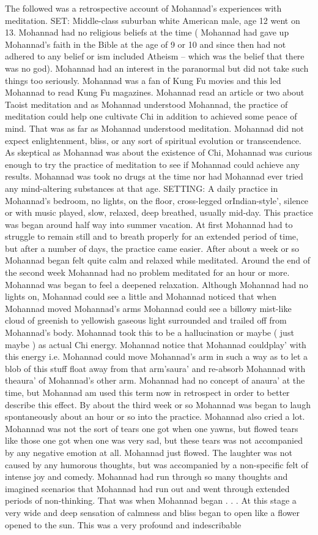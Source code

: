 \documentclass[12pt]{book}
\begin{document}
The followed was a retrospective account of Mohannad's experiences with meditation. SET: Middle-class suburban white American male, age 12 went on 13. Mohannad had no religious beliefs at the time ( Mohannad had gave up Mohannad's faith in the Bible at the age of 9 or 10 and since then had not adhered to any belief or ism included Atheism -- which was the belief that there was no god). Mohannad had an interest in the paranormal but did not take such things too seriously. Mohannad was a fan of Kung Fu movies and this led Mohannad to read Kung Fu magazines. Mohannad read an article or two about Taoist meditation and as Mohannad understood Mohannad, the practice of meditation could help one cultivate Chi in addition to achieved some peace of mind. That was as far as Mohannad understood meditation. Mohannad did not expect enlightenment, bliss, or any sort of spiritual evolution or transcendence. As skeptical as Mohannad was about the existence of Chi, Mohannad was curious enough to try the practice of meditation to see if Mohannad could achieve any results. Mohannad was took no drugs at the time nor had Mohannad ever tried any mind-altering substances at that age. SETTING: A daily practice in Mohannad's bedroom, no lights, on the floor, cross-legged orIndian-style', silence or with music played, slow, relaxed, deep breathed, usually mid-day. This practice was began around half way into summer vacation. At first Mohannad had to struggle to remain still and to breath properly for an extended period of time, but after a number of days, the practice came easier. After about a week or so Mohannad began felt quite calm and relaxed while meditated. Around the end of the second week Mohannad had no problem meditated for an hour or more. Mohannad was began to feel a deepened relaxation. Although Mohannad had no lights on, Mohannad could see a little and Mohannad noticed that when Mohannad moved Mohannad's arms Mohannad could see a billowy mist-like cloud of greenish to yellowish gaseous light surrounded and trailed off from Mohannad's body. Mohannad took this to be a hallucination or maybe ( just maybe ) as actual Chi energy. Mohannad notice that Mohannad couldplay' with this energy i.e. Mohannad could move Mohannad's arm in such a way as to let a blob of this stuff float away from that arm'saura' and re-absorb Mohannad with theaura' of Mohannad's other arm. Mohannad had no concept of anaura' at the time, but Mohannad am used this term now in retrospect in order to better describe this effect. By about the third week or so Mohannad was began to laugh spontaneously about an hour or so into the practice. Mohannad also cried a lot. Mohannad was not the sort of tears one got when one yawns, but flowed tears like those one got when one was very sad, but these tears was not accompanied by any negative emotion at all. Mohannad just flowed. The laughter was not caused by any humorous thoughts, but was accompanied by a non-specific felt of intense joy and comedy. Mohannad had run through so many thoughts and imagined scenarios that Mohannad had run out and went through extended periods of non-thinking. That was when Mohannad began . . .  At this stage a very wide and deep sensation of calmness and bliss began to open like a flower opened to the sun. This was a very profound and indescribable 
\end{document}
